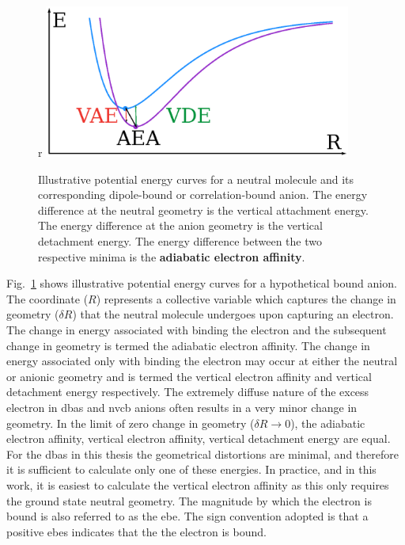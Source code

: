 \begin{figure}{r}
	\centering
	\includegraphics[width=0.9\textwidth,keepaspectratio]{Images/chapter1/morse.eps}
	\caption{Illustrative potential energy curves for a neutral molecule and its corresponding dipole-bound or correlation-bound anion. The energy difference at the neutral geometry is the vertical attachment energy. The energy difference at the anion geometry is the vertical detachment energy. The energy difference between the two respective minima is the \textbf{adiabatic electron affinity}.}
	\label{fig:morse}
\end{figure}

Fig.~\ref{fig:morse} shows illustrative potential energy curves for a hypothetical bound anion.
The coordinate ($R$) represents a collective variable which captures the change in geometry ($\delta R$) that the neutral molecule undergoes upon capturing an electron.
The change in energy associated with binding the electron and the subsequent change in geometry is termed the adiabatic electron affinity.
The change in energy associated only with binding the electron may occur at either the neutral or anionic geometry and is termed the vertical electron affinity and vertical detachment energy respectively.
The extremely diffuse nature of the excess electron in \glspl{dba} and \gls{nvcb} anions often results in a very minor change in geometry.
In the limit of zero change in geometry ($\delta R \rightarrow 0$), the adiabatic electron affinity, vertical electron affinity, vertical detachment energy are equal.
For the \glspl{dba} in this thesis the geometrical distortions are minimal, and therefore it is sufficient to calculate only one of these energies.
In practice, and in this work, it is easiest to calculate the vertical electron affinity as this only requires the ground state neutral geometry.
The magnitude by which the electron is bound is also referred to as the \gls{ebe}.
The sign convention adopted is that a positive \glspl{ebe} indicates that the the electron is bound.

